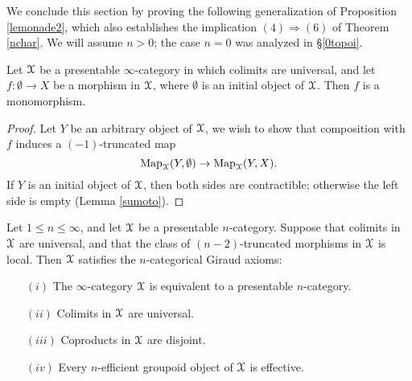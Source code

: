 We conclude this section by proving the following generalization of Proposition \ref{lemonade2}, which also establishes the implication $(4) \Rightarrow (6)$ of Theorem \ref{nchar}. We will assume $n > 0$; the case $n = 0$ was analyzed in \S \ref{0topoi}.

\begin{lemma}\label{corsumoto}
Let $\operatorname{\mathcal{X}}$ be a presentable $\infty$-category in which colimits are universal, and let
$f: \emptyset \rightarrow X$ be a morphism in $\operatorname{\mathcal{X}}$, where $\emptyset$ is an initial object of $\operatorname{\mathcal{X}}$. Then $f$ is a monomorphism.
\end{lemma}

\begin{proof}
Let $Y$ be an arbitrary object of $\operatorname{\mathcal{X}}$, we wish to show that composition with $f$
induces a $(-1)$-truncated map
$$ \operatorname{{Map}}_{\operatorname{\mathcal{X}}}( Y, \emptyset) \rightarrow \operatorname{{Map}}_{\operatorname{\mathcal{X}}}(Y, X).$$
If $Y$ is an initial object of $\operatorname{\mathcal{X}}$, then both sides are contractible; otherwise
the left side is empty (Lemma \ref{sumoto}).
\end{proof}

\begin{proposition}\label{ncharles}
Let $1 \leq n \leq \infty$, and let $\operatorname{\mathcal{X}}$ be a presentable $n$-category. Suppose that
colimits in $\operatorname{\mathcal{X}}$ are universal, and that the class of $(n-2)$-truncated morphisms in $\operatorname{\mathcal{X}}$ is local. Then $\operatorname{\mathcal{X}}$ satisfies the $n$-categorical Giraud axioms:
\begin{itemize}
\item[$(i)$] The $\infty$-category $\operatorname{\mathcal{X}}$ is equivalent to a presentable $n$-category.
\item[$(ii)$] Colimits in $\operatorname{\mathcal{X}}$ are universal.
\item[$(iii)$] Coproducts in $\operatorname{\mathcal{X}}$ are disjoint.
\item[$(iv)$] Every $n$-efficient groupoid object of $\operatorname{\mathcal{X}}$ is effective.
\end{itemize}
\end{proposition}

